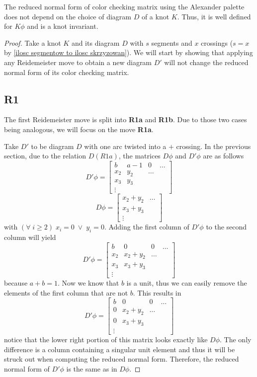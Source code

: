 \begin{theorem}
  The reduced normal form of color checking matrix using the Alexander palette does not depend on the choice of diagram $D$ of a knot $K$. Thus, it is well defined for $K\phi$ and is a knot invariant.
\end{theorem}

\begin{proof}
  Take a knot $K$ and its diagram $D$ with $s$ segments and $x$ crossings ($s=x$ by \cref{ilosc segmentow to ilosc skrzyzowan}). We will start by showing that applying any Reidemeister move to obtain a new diagram $D'$ will not change the reduced normal form of its color checking matrix.

  \subsection*{\centering R1}

  The first Reidemeister move is split into \textbf{R1a} and \textbf{R1b}. Due to those two cases being analogous, we will focus on the move \textbf{R1a}.

  Take $D'$ to be diagram $D$ with one arc twisted into a $+$ crossing. In the previous section, due to the relation $D(R1a)$, the matrices $D\phi$ and $D'\phi$ are as follows
  $$
  D'\phi=
  \begin{bmatrix}
    b & a-1 & 0 & \hdots\\ 
    x_2 & y_2 & \hdots \\ 
    x_3 & y_3 \\ 
    \vdots 
  \end{bmatrix}
  $$
  $$
  D\phi=
  \begin{bmatrix}
    x_2 + y_2 & \hdots \\ 
    x_3 + y_3 \\ 
    \vdots
  \end{bmatrix}
  $$
  with $(\forall\; i\geq 2)\;x_i=0\;\lor\; y_i=0$. Adding the first column of $D'\phi$ to the second column will yield 
  $$
  D'\phi=
  \begin{bmatrix}
    b & 0 & 0 & \hdots\\ 
    x_2 & x_2+y_2 & \hdots \\ 
    x_3 & x_3+y_3 \\ 
    \vdots 
  \end{bmatrix}
  $$
  because $a+b=1$. Now we know that $b$ is a unit, thus we can easily remove the elements of the first column that are not $b$. This results in 
  $$
  D'\phi=
  \begin{bmatrix}
    b & 0 & 0 & \hdots\\ 
    0 & x_2+y_2 & \hdots \\ 
    0 & x_3+y_3 \\ 
    \vdots 
  \end{bmatrix}
  $$
  notice that the lower right portion of this matrix looks exactly like $D\phi$. The only difference is a column containing a singular unit element and thus it will be struck out when computing the reduced normal form. Therefore, the reduced normal form of $D'\phi$ is the same as in $D\phi$.
  

\end{proof}
